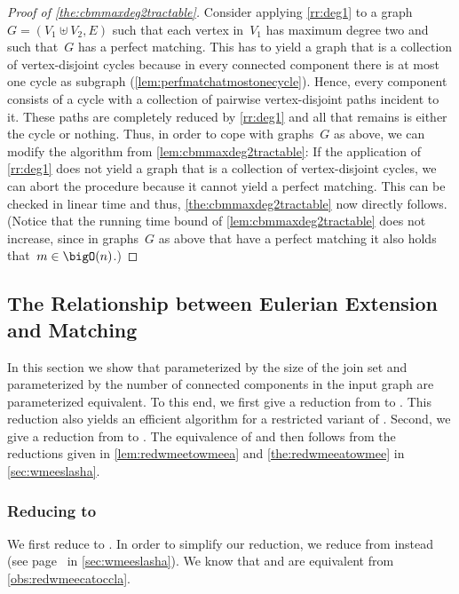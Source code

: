 \begin{proof}[Proof of \autoref{the:cbmmaxdeg2tractable}]
Consider applying \autoref{rr:deg1} to a graph~$G = (V_1 \uplus V_2, E)$ such that each vertex in~$V_1$ has maximum degree two and such that~$G$ has a perfect matching. This has to yield a graph that is a collection of vertex-disjoint cycles because in every connected component there is at most one cycle as subgraph (\autoref{lem:perfmatchatmostonecycle}). Hence, every component consists of a cycle with a collection of pairwise vertex-disjoint paths incident to it. These paths are completely reduced by \autoref{rr:deg1} and all that remains is either the cycle or nothing. Thus, in order to cope with graphs~$G$ as above, we can modify the algorithm from \autoref{lem:cbmmaxdeg2tractable}: If the application of \autoref{rr:deg1} does not yield a graph that is a collection of vertex-disjoint cycles, we can abort the procedure because it cannot yield a perfect matching. This can be checked in linear time and thus, \autoref{the:cbmmaxdeg2tractable} now directly follows. (Notice that the running time bound of \autoref{lem:cbmmaxdeg2tractable} does not increase, since in graphs~$G$ as above that have a perfect matching it also holds that~$m \in \bigO(n)$.)
\end{proof}



\subsection{The Relationship between Eulerian Extension and Matching} \label{sec:releecbm}

In this section we show that \pCBMs{} parameterized by the size of the join set and \pWMEEs{} parameterized by the number of connected components in the input graph are parameterized equivalent. To this end, we first give a reduction from \pWMEECAs{} to \pCBMs{}. This reduction also yields an efficient algorithm for a restricted variant of \pWMEEs{}. Second, we give a reduction from \pCBMs{} to \pWMEEAs{}. The equivalence of \pWMEEs{} and \pCBMs{} then follows from the reductions given in \autoref{lem:redwmeetowmeea} and \autoref{the:redwmeeatowmee} in \autoref{sec:wmeeslasha}.



\subsubsection{Reducing \pWMEECAs{} to \pCBMs{}}
We first reduce \pWMEECAs{} to \pCBMs{}. In order to simplify our reduction, we reduce from \pWMEECCLAs{} instead (see page~\pageref{def:pWMEECA} in \autoref{sec:wmeeslasha}). We know that \pWMEECCLAs{} and \pWMEECAs{} are equivalent from \autoref{obs:redwmeecatoccla}.

